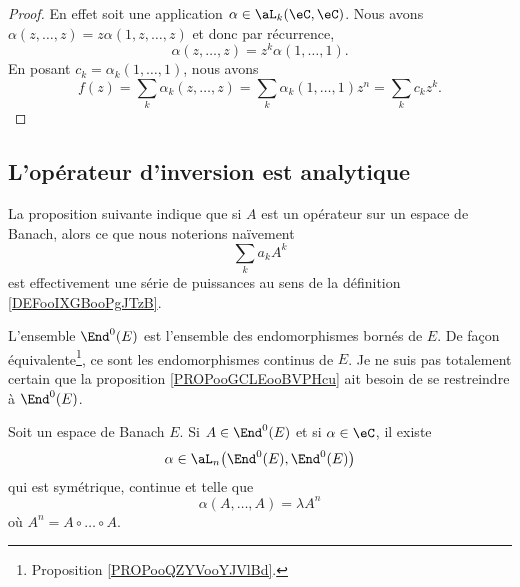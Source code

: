 \begin{proof}
	En effet soit une application \( \alpha\in \aL_k(\eC,\eC)\). Nous avons \( \alpha(z,\ldots,z)=z\alpha(1,z,\ldots,z)\) et donc par récurrence,
	\begin{equation}
		\alpha(z,\ldots,z)=z^{k}\alpha(1,\ldots,1).
	\end{equation}
	En posant \( c_k=\alpha_k(1,\ldots,1)\), nous avons
	\begin{equation}
		f(z)=\sum_k\alpha_k(z,\ldots,z)=\sum_k\alpha_k(1,\ldots,1)z^n=\sum_kc_kz^k.
	\end{equation}
\end{proof}

\subsection{L'opérateur d'inversion est analytique}

La proposition suivante indique que si \( A\) est un opérateur sur un espace de Banach, alors ce que nous noterions naïvement
\begin{equation}
	\sum_ka_kA^k
\end{equation}
est effectivement une série de puissances au sens de la définition \ref{DEFooIXGBooPgJTzB}.

L'ensemble \( \End^0(E)\) est l'ensemble des endomorphismes bornés de \( E\). De façon équivalente\footnote{Proposition \ref{PROPooQZYVooYJVlBd}.}, ce sont les endomorphismes continus de \( E\). Je ne suis pas totalement certain que la proposition \ref{PROPooGCLEooBVPHcu} ait besoin de se restreindre à \( \End^0(E)\).

\begin{proposition}	\label{PROPooGCLEooBVPHcu}
	Soit un espace de Banach \( E\). Si \( A\in \End^0(E)\) et si \( \alpha\in\eC \), il existe
	\begin{equation}
		\alpha\in\aL_n\big( \End^0(E),\End^0(E) \big)
	\end{equation}
	qui est symétrique, continue et telle que
	\begin{equation}
		\alpha(A,\ldots,A)=\lambda A^n
	\end{equation}
	où \( A^n=A\circ\ldots\circ A\).
\end{proposition}

